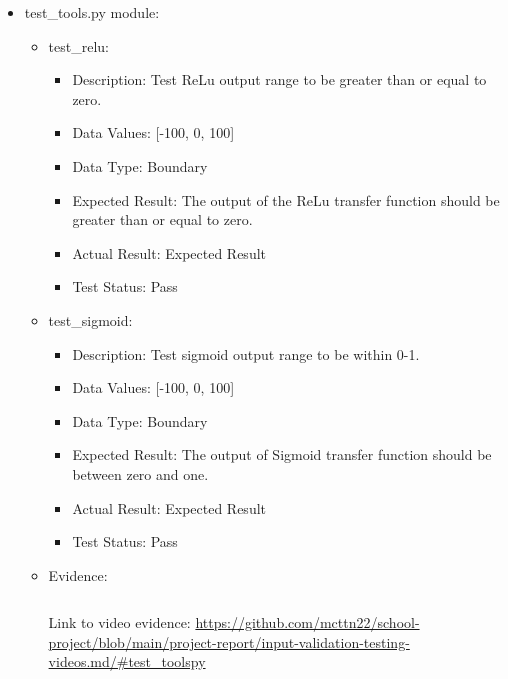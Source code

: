 \documentclass[./project-report/src/latex/project-report.tex]{subfiles}
\begin{document}
\begin{itemize}
\begin{itemize}
\begin{itemize}
				\end{itemize}
            \item test\_tools.py module:
				\begin{itemize}
					\item test\_relu:
					\begin{itemize}
						\item Description: Test ReLu output range to be greater than or equal to zero.
						\item Data Values: [-100, 0, 100]
						\item Data Type: Boundary
						\item Expected Result: The output of the ReLu transfer function should be greater than or equal to zero.
						\item Actual Result: Expected Result
						\item Test Status: Pass
					\end{itemize}
					\item test\_sigmoid:
					\begin{itemize}
						\item Description: Test sigmoid output range to be within 0-1.
						\item Data Values: [-100, 0, 100]
						\item Data Type: Boundary
						\item Expected Result: The output of Sigmoid transfer function should be between zero and one.
						\item Actual Result: Expected Result
						\item Test Status: Pass
					\end{itemize}
					\item Evidence:
                		\inputminted{python}{./school_project/test/models/cpu/utils/test_tools.py}

						\pagebreak

						\begin{figure}[h!]
						\centering
						\end{figure}
	
						Link to video evidence: \url{https://github.com/mcttn22/school-project/blob/main/project-report/input-validation-testing-videos.md/#test_toolspy}
				\end{itemize}
        \end{itemize}
\end{itemize}
\end{document}
